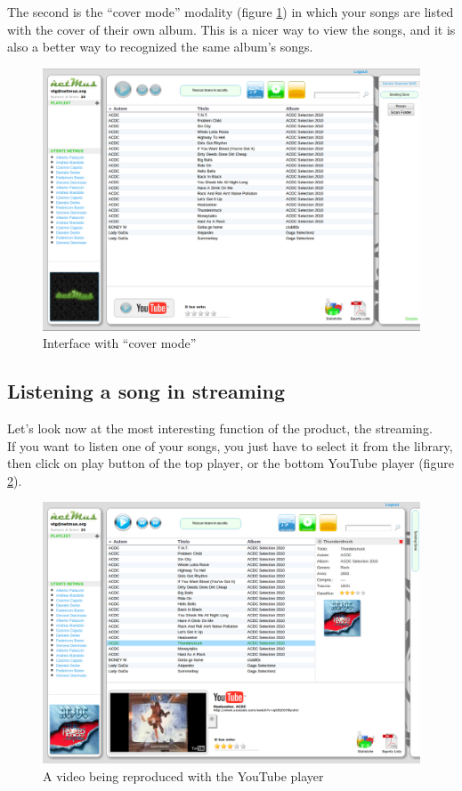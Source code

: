The second is the ``cover mode'' modality (figure
\ref{fig:coverMode}) in which your songs are listed with
the cover of their own album. This is a nicer way to view the songs, and it is also
a better way to recognized the same album's songs.\\

\begin{figure}[!htbp]
  \centering
  \includegraphics[width=14cm]{img/MU/song_loaded.png}
\caption{Interface with ``cover mode''}
\label{fig:coverMode}
\end{figure}

\subsection{Listening a song in streaming}

Let's look now at the most interesting function of the
product, the streaming.\\
If you want to listen one of your songs, you just have to select it from the
library, then click on play button of the top player, or the
bottom YouTube player (figure \ref{fig:play}).\\
\begin{figure}[!htbp]
  \centering
  \includegraphics[width=15cm]{img/MU/player_youtube.png}
\caption{A video being reproduced with the YouTube player}
\label{fig:play}
\end{figure} 

